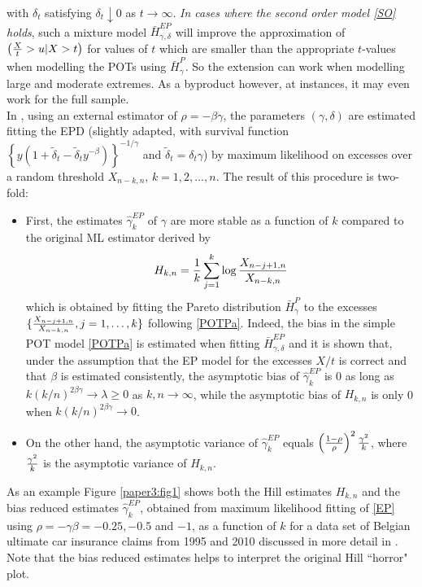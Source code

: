 with $\delta_t$ satisfying $\delta_t \downarrow 0$ as $t \to \infty$.
 {\it In cases where the second order model \eqref{SO} holds}, such a mixture model $\bar{H}_{\gamma,\delta}^{EP}$ will improve the approximation of $\left( {X \over t} >u | X>t \right)$ for values of $t$ which are smaller than the appropriate $t$-values when modelling the POTs using $\bar{H}_{\gamma}^{P}$. So the extension can work when modelling large and moderate extremes. As a byproduct however, at instances, it may even work for the full sample.
\\
In \cite{beirlant2009second}, using an external estimator of $\rho=-\beta\gamma$, the parameters $(\gamma, \delta)$ are estimated fitting the EPD (slightly adapted, with survival function $ \left\{y (1+ \tilde{\delta}_t -\tilde{\delta}_t y^{-\beta}) \right\}^{-1/\gamma}$ and $\tilde\delta _t = \delta_t \gamma$) by maximum likelihood on excesses over a random threshold $X_{n-k,n}$, $k=1,2,\ldots,n$. 
The result of this procedure is two-fold:
\begin{itemize}
\item First, the estimates $\hat{\gamma}_k^{EP}$ of $\gamma$ are more stable as a function of $k$ compared to the original ML estimator derived by \cite{hill1975simple}
$$
H_{k,n} = {1 \over k} \sum_{j=1}^k \log {X_{n-j+1,n}\over X_{n-k,n}}
$$
 which is obtained by fitting the Pareto distribution $\bar{H}_{\gamma}^P$ to the excesses 
 $\{ {X_{n-j+1,n}\over X_{n-k,n}}, j=1,\ldots,k\}$ following \eqref{POTPa}. Indeed, the bias in the simple POT model \eqref{POTPa} is estimated when fitting $\bar{H}_{\gamma,\delta}^{EP}$ and it is shown that, under the assumption that the EP model for the excesses $X/t$ is correct and that $\beta$ is estimated consistently, the asymptotic bias of $\hat{\gamma}_k^{EP}$ is 0 as long as $k (k/n)^{2\beta\gamma} \to \lambda \geq 0$ as $k,n \to \infty$, while the asymptotic bias of $H_{k,n}$ is only 0 when $k (k/n)^{2\beta\gamma} \to 0$.
 \item On the other hand, the asymptotic variance of $\hat{\gamma}_k^{EP}$ equals $\left({1-\rho\over \rho}\right)^2 {\gamma^2 \over k}$, where ${\gamma^2 \over k}$ is the asymptotic variance of $H_{k,n}$. 
\end{itemize}
As an example Figure \ref{paper3:fig1} shows both the Hill estimates $H_{k,n}$ and the bias reduced estimates $\hat{\gamma}_k^{EP}$, obtained from maximum likelihood fitting of \eqref{EP} using $\rho=-\gamma\beta=-0.25, -0.5$ and $-1$, as a function of $k$ for a data set of Belgian ultimate car insurance claims from 1995 and 2010 discussed in more detail in \cite{albrecher2017reinsurance}. Note that the bias reduced estimates helps to interpret the original Hill ``horror" plot.
